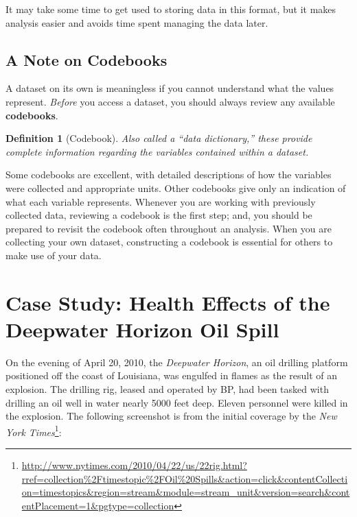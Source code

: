 \documentclass[
]{book}
\theoremstyle{plain}
\theoremstyle{mydefn}
\newtheorem{definition}{Definition}[chapter]
\theoremstyle{myexmpl}
\theoremstyle{remark}
\begin{document}
It may take some time to get used to storing data in this format, but it makes analysis easier and avoids time spent managing the data later.

\hypertarget{a-note-on-codebooks}{%
\section{A Note on Codebooks}\label{a-note-on-codebooks}}

A dataset on its own is meaningless if you cannot understand what the values represent. \emph{Before} you access a dataset, you should always review any available \textbf{codebooks}.

\begin{definition}[Codebook]
\protect\hypertarget{def:defn-codebook}{}{\label{def:defn-codebook} {} }Also called a ``data dictionary,'' these provide complete information regarding the variables contained within a dataset.
\end{definition}

Some codebooks are excellent, with detailed descriptions of how the variables were collected and appropriate units. Other codebooks give only an indication of what each variable represents. Whenever you are working with previously collected data, reviewing a codebook is the first step; and, you should be prepared to revisit the codebook often throughout an analysis. When you are collecting your own dataset, constructing a codebook is essential for others to make use of your data.

\hypertarget{CaseDeepwater}{%
\chapter{Case Study: Health Effects of the Deepwater Horizon Oil Spill}\label{CaseDeepwater}}

On the evening of April 20, 2010, the \emph{Deepwater Horizon}, an oil drilling platform positioned off the coast of Louisiana, was engulfed in flames as the result of an explosion. The drilling rig, leased and operated by BP, had been tasked with drilling an oil well in water nearly 5000 feet deep. Eleven personnel were killed in the explosion. The following screenshot is from the initial coverage by the \emph{New York Times}\footnote{\url{http://www.nytimes.com/2010/04/22/us/22rig.html?rref=collection\%2Ftimestopic\%2FOil\%20Spills\&action=click\&contentCollection=timestopics\&region=stream\&module=stream_unit\&version=search\&contentPlacement=1\&pgtype=collection}}:
\end{document}
